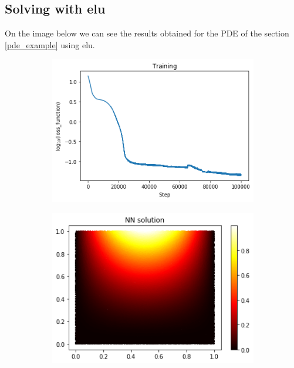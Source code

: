 \subsection{Solving with elu}
On the image below we can see the results obtained for the PDE of the section \ref{pde_example} using elu.
\vspace{-0.45cm}
\begin{figure}[H]
\begin{subfigure}{.45\textwidth}
    \centering
    \includegraphics[width=.8\linewidth]{images/NN_Jax_PDE8_files_elu/NN_Jax_PDE8_18_1.png}
    \label{fig:sub1}
\end{subfigure}%
\begin{subfigure}{0.45\textwidth}
    \centering
    \includegraphics[width=0.8\linewidth]{images/NN_Jax_PDE8_files_elu/NN_Jax_PDE8_20_0.png}
    \label{fig:sub2}
\end{subfigure}
\newline
\begin{subfigure}{.45\textwidth}
    \centering

\end{subfigure}
\end{figure}

